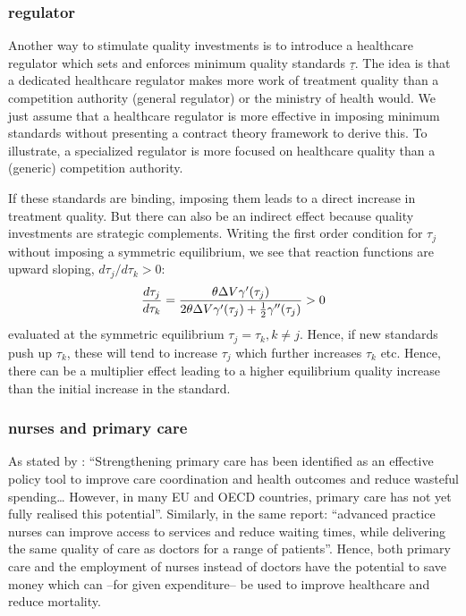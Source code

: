 \documentclass[a4paper,12pt]{article}
\begin{document}
\subsubsection{regulator}
\label{sec:orge381ccb}

Another way to stimulate quality investments is to introduce a healthcare regulator which sets and enforces minimum quality standards \(\underline \tau\). The idea is that a dedicated healthcare regulator makes more work of treatment quality than a competition authority (general regulator) or the ministry of health would. We just assume that a healthcare regulator is more effective in imposing minimum standards without presenting a contract theory framework to derive this. To illustrate, a specialized regulator is more focused on healthcare quality than a (generic) competition authority.

If these standards are binding, imposing them leads to a direct increase in treatment quality. But there can also be an indirect effect because quality investments are strategic complements. Writing the first order condition for \(\tau_j\) without imposing a symmetric equilibrium, we see that reaction functions are upward sloping, \(d \tau_j/d \tau_k > 0\):
\begin{equation}
\label{eq:28}
\frac{d\tau_j}{d\tau_k} = \frac{\theta \Delta V \gamma'(\tau_j)}{2\theta\Delta V \gamma'(\tau_j) + \textstyle{1\over 2} \gamma''(\tau_j)} > 0
\end{equation}
evaluated at the symmetric equilibrium \(\tau_j=\tau_k, k \neq j\). Hence, if new standards push up \(\tau_k\), these will tend to increase \(\tau_j\) which further increases \(\tau_k\) etc. Hence, there can be a multiplier effect leading to a higher equilibrium quality increase than the initial increase in the standard.

\subsubsection{nurses and primary care}
\label{sec:org4084edf}

As stated by \cite{OECD_2020}: ``Strengthening primary care has been identified as an effective policy tool to improve care coordination and health outcomes and reduce wasteful spending\ldots{} However, in many EU and OECD countries, primary care has not yet fully realised this potential''. Similarly, in the same report: ``advanced practice nurses can improve access to services and reduce waiting times, while delivering the same quality of care as doctors for a range of patients''. Hence, both primary care and the employment of nurses instead of doctors have the potential to save money which can --for given expenditure-- be used to improve healthcare and reduce mortality.
\end{document}
